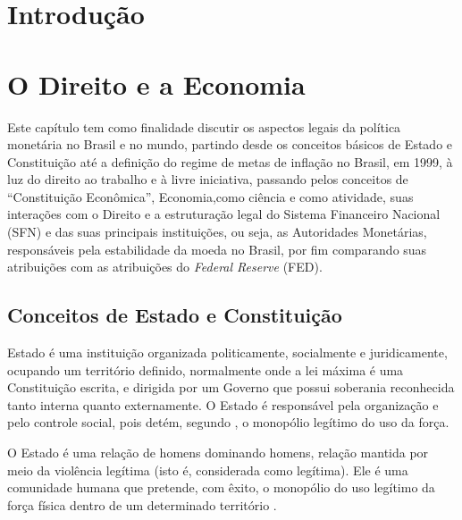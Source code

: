 \documentclass[
	10pt,				%
	openright,			%
	twoside,			%
	a5paper,			%
	english,			%
	french,				%
	spanish,			%
	brazil				%
	]{abntex2}
\renewenvironment{quote}
  {\small\list{}{\rightmargin=0.1cm \leftmargin=4cm}%
   \item\relax}
  {\endlist}
\begin{document}
\tableofcontents*
\cleardoublepage


\textual
\pagestyle{simple}                  %


\chapter*{Introdução}\label{introduuxe7uxe3o}

\chapter{O Direito e a Economia}\label{cap:1}

Este capítulo tem como finalidade discutir os aspectos legais da
política monetária no Brasil e no mundo, partindo desde os conceitos
básicos de Estado e Constituição até a definição do regime de metas de
inflação no Brasil, em 1999, à luz do direito ao trabalho e à livre
iniciativa, passando pelos conceitos de ``Constituição Econômica'',
Economia,como ciência e como atividade, suas interações com o Direito e
a estruturação legal do Sistema Financeiro Nacional (SFN) e das suas
principais instituições, ou seja, as Autoridades Monetárias,
responsáveis pela estabilidade da moeda no Brasil, por fim comparando
suas atribuições com as atribuições do \emph{Federal Reserve} (FED).

\section{Conceitos de Estado e
Constituição}\label{conceitos-de-estado-e-constituiuxe7uxe3o}

Estado é uma instituição organizada politicamente, socialmente e
juridicamente, ocupando um território definido, normalmente onde a lei
máxima é uma Constituição escrita, e dirigida por um Governo que possui
soberania reconhecida tanto interna quanto externamente. O Estado é
responsável pela organização e pelo controle social, pois detém, segundo
, o monopólio legítimo do uso da força.

\begin{quote}
O Estado é uma relação de homens dominando homens, relação mantida por
meio da violência legítima (isto é, considerada como legítima). Ele é
uma comunidade humana que pretende, com êxito, o monopólio do uso
legítimo da força física dentro de um determinado território
\cite{weber}.
\end{quote}
\end{document}
